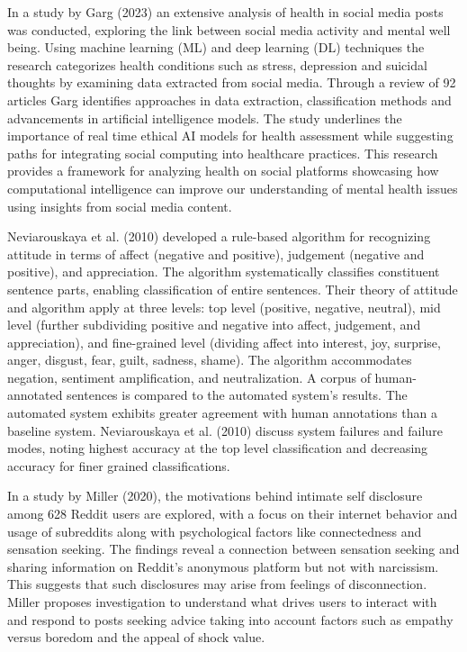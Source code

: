 \documentclass[sigconf, nonacm]{acmart}
\begin{document}
In a study by Garg (2023) an extensive analysis of health in social media posts was conducted, exploring the link between social media activity and mental well being. Using machine learning (ML) and deep learning (DL) techniques the research categorizes health conditions such as stress, depression and suicidal thoughts by examining data extracted from social media. Through a review of 92 articles Garg identifies approaches in data extraction, classification methods and advancements in artificial intelligence models. The study underlines the importance of real time ethical AI models for health assessment while suggesting paths for integrating social computing into healthcare practices. This research provides a framework for analyzing health on social platforms showcasing how computational intelligence can improve our understanding of mental health issues using insights from social media content. 


Neviarouskaya et al. (2010) developed a rule-based algorithm for recognizing attitude in terms of affect (negative and positive), judgement (negative and positive), and appreciation. The algorithm systematically classifies constituent sentence parts, enabling classification of entire sentences. Their theory of attitude and algorithm apply at three levels: top level (positive, negative, neutral), mid level (further subdividing positive and negative into affect, judgement, and appreciation), and fine-grained level (dividing affect into interest, joy, surprise, anger, disgust, fear, guilt, sadness, shame). The algorithm accommodates negation, sentiment amplification, and neutralization. A corpus of human-annotated sentences is compared to the automated system's results. The automated system exhibits greater agreement with human annotations than a baseline system. Neviarouskaya et al. (2010) discuss system failures and failure modes, noting highest accuracy at the top level classification and decreasing accuracy for finer grained classifications. 

In a study by Miller (2020), the motivations behind intimate self disclosure among 628 Reddit users are explored, with a focus on their internet behavior and usage of subreddits along with psychological factors like connectedness and sensation seeking. The findings reveal a connection between sensation seeking and sharing information on Reddit’s anonymous platform but not with narcissism. This suggests that such disclosures may arise from feelings of disconnection. Miller proposes investigation to understand what drives users to interact with and respond to posts seeking advice taking into account factors such as empathy versus boredom and the appeal of shock value. 
\end{document}
